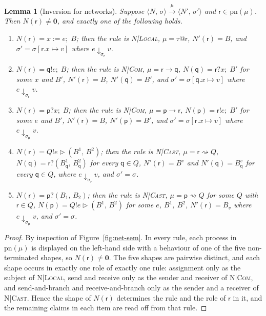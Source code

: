\documentclass[11pt]{article}
\makeatletter
\theoremstyle{plain}
\newtheorem{lemma}[theorem]{Lemma}
\theoremstyle{definition}
\theoremstyle{remark}
\newcommand{\nil}{\mathbf{0}}
\newcommand{\seq}{;\;}
\newcommand{\pp}{\mathsf{p}}
\newcommand{\qq}{\mathsf{q}}
\newcommand{\rr}{\mathsf{r}}
\newcommand{\pn}{\mathrm{pn}}
\newcommand{\eval}[3]{#1 \downarrow_{#2} #3}
\newcommand{\conf}[2]{\langle #1,\, #2\rangle}
\newcommand{\lto}[1]{\xrightarrow{\;#1\;}}
\newcommand{\tauat}[1]{\tau\mathord{@}#1}
\newcommand{\cast}[2]{#1 \rightsquigarrow #2}
\newcommand{\upd}[3]{#1[#2 \mapsto #3]}
\newcommand{\rn}[1]{{\normalfont\scshape #1}}
\newcommand{\sendbr}[4]{#1!#2 \mathbin{\triangleright} (#3,\, #4)}
\newcommand{\recvbr}[3]{#1?(#2,\, #3)}
\makeatother
\begin{document}
\begin{lemma}[Inversion for networks]\label{lem:inversion}
  Suppose $\conf{N}{\sigma}\lto{\mu}\conf{N'}{\sigma'}$ and $\rr\in\pn(\mu)$.
  Then $N(\rr)\neq\nil$, and exactly one of the following holds.
  \begin{enumerate}[label=(\alph*),nosep]
  \item\label{it:inv-local} $N(\rr) = x := e\seq B$; then the rule is \rn{N|Local}, $\mu = \tauat\rr$, $N'(\rr) = B$, and $\sigma' = \upd{\sigma}{\rr.x}{v}$ where $\eval{e}{\sigma_\rr}{v}$.
  \item\label{it:inv-send} $N(\rr) = \qq!e\seq B$; then the rule is \rn{N|Com}, $\mu = \rr\to\qq$, $N(\qq) = \rr?x\seq B'$ for some $x$ and $B'$, $N'(\rr) = B$, $N'(\qq) = B'$, and $\sigma' = \upd{\sigma}{\qq.x}{v}$ where $\eval{e}{\sigma_\rr}{v}$.
  \item\label{it:inv-recv} $N(\rr) = \pp?x\seq B$; then the rule is \rn{N|Com}, $\mu = \pp\to\rr$, $N(\pp) = \rr!e\seq B'$ for some $e$ and $B'$, $N'(\rr) = B$, $N'(\pp) = B'$, and $\sigma' = \upd{\sigma}{\rr.x}{v}$ where $\eval{e}{\sigma_\pp}{v}$.
  \item\label{it:inv-cast} $N(\rr) = \sendbr{Q}{e}{B^1}{B^2}$; then the rule is \rn{N|Cast}, $\mu = \cast{\rr}{Q}$, $N(\qq) = \recvbr{\rr}{B_\qq^1}{B_\qq^2}$ for every $\qq\in Q$, $N'(\rr) = B^v$ and $N'(\qq) = B_\qq^v$ for every $\qq\in Q$, where $\eval{e}{\sigma_\rr}{v}$, and $\sigma' = \sigma$.
  \item\label{it:inv-brecv} $N(\rr) = \recvbr{\pp}{B_1}{B_2}$; then the rule is \rn{N|Cast}, $\mu = \cast{\pp}{Q}$ for some $Q$ with $\rr\in Q$, $N(\pp) = \sendbr{Q}{e}{B^1}{B^2}$ for some $e$, $B^1$, $B^2$, $N'(\rr) = B_v$ where $\eval{e}{\sigma_\pp}{v}$, and $\sigma' = \sigma$.
  \end{enumerate}
\end{lemma}
\begin{proof}
  By inspection of Figure~\ref{fig:net-sem}.  In every rule, each process in
  $\pn(\mu)$ is displayed on the left-hand side with a behaviour of one of the
  five non-terminated shapes, so $N(\rr)\neq\nil$.  The five shapes are
  pairwise distinct, and each shape occurs in exactly one role of exactly one
  rule: assignment only as the subject of \rn{N|Local}, send and receive only
  as the sender and receiver of \rn{N|Com}, and send-and-branch and
  receive-and-branch only as the sender and a receiver of \rn{N|Cast}.  Hence
  the shape of $N(\rr)$ determines the rule and the role of $\rr$ in it, and
  the remaining claims in each item are read off from that rule.
\end{proof}
\end{document}
